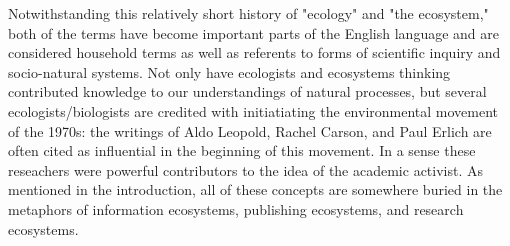  Notwithstanding this relatively short history of "ecology" and "the ecosystem," both of the terms have become important parts of the English language and are considered household terms as well as referents to forms of scientific inquiry and socio-natural systems. Not only have ecologists and ecosystems thinking contributed knowledge to our understandings of natural processes, but several ecologists/biologists are credited with initiatiating the environmental movement of the 1970s: the writings of Aldo Leopold, Rachel Carson, and Paul Erlich are often cited as influential in the beginning of this movement. In a sense these reseachers were powerful contributors to the idea of the academic activist. As mentioned in the introduction, all of these concepts are somewhere buried in the metaphors of information ecosystems, publishing ecosystems, and research ecosystems.


